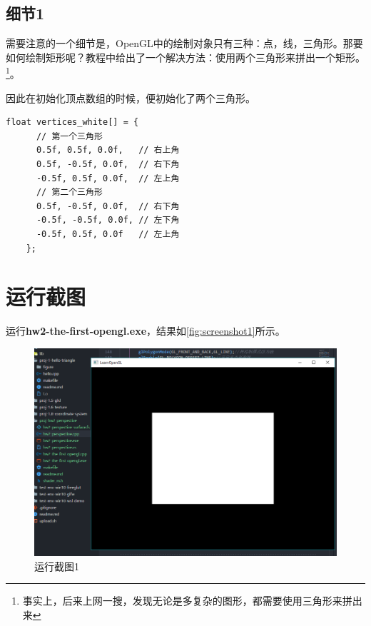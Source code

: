 \documentclass[forprint]{myreport}
\begin{document}
\subsection{细节1}

需要注意的一个细节是，OpenGL中的绘制对象只有三种：点，线，三角形。那要如何绘制矩形呢？教程\cite{r1}中给出了一个解决方法：使用两个三角形来拼出一个矩形。\footnote{事实上，后来上网一搜，发现无论是多复杂的图形，都需要使用三角形来拼出来}。

因此在初始化顶点数组的时候，便初始化了两个三角形。



\begin{lstlisting}[style = c]
    float vertices_white[] = {
      // 第一个三角形
      0.5f, 0.5f, 0.0f,   // 右上角
      0.5f, -0.5f, 0.0f,  // 右下角
      -0.5f, 0.5f, 0.0f,  // 左上角
      // 第二个三角形
      0.5f, -0.5f, 0.0f,  // 右下角
      -0.5f, -0.5f, 0.0f, // 左下角
      -0.5f, 0.5f, 0.0f   // 左上角
    };
\end{lstlisting}



\section{运行截图}

运行\textbf{hw2-the-first-opengl.exe}，结果如\autoref{fig:screenshot1}所示。

\begin{figure}[htp]
  \centering
  \includegraphics[width=13cm]{"./figure/2018-05-01-15-06-43.png"}
  \caption{运行截图1}
  \label{fig:screenshot1}
\end{figure}
\end{document}
